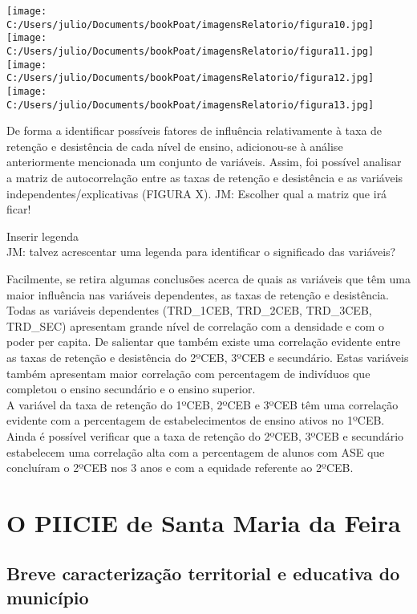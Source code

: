 \documentclass[
]{book}
\begin{document}
\texttt{[image: C:/Users/julio/Documents/bookPoat/imagensRelatorio/figura10.jpg]}\\
\texttt{[image: C:/Users/julio/Documents/bookPoat/imagensRelatorio/figura11.jpg]}\\
\texttt{[image: C:/Users/julio/Documents/bookPoat/imagensRelatorio/figura12.jpg]}\\
\texttt{[image: C:/Users/julio/Documents/bookPoat/imagensRelatorio/figura13.jpg]}

De forma a identificar possíveis fatores de influência relativamente à taxa de retenção e desistência de cada nível de ensino, adicionou-se à análise anteriormente mencionada um conjunto de variáveis. Assim, foi possível analisar a matriz de autocorrelação entre as taxas de retenção e desistência e as variáveis independentes/explicativas (FIGURA X).
JM: Escolher qual a matriz que irá ficar!

Inserir legenda\\
JM: talvez acrescentar uma legenda para identificar o significado das variáveis?

Facilmente, se retira algumas conclusões acerca de quais as variáveis que têm uma maior influência nas variáveis dependentes, as taxas de retenção e desistência. Todas as variáveis dependentes (TRD\_1CEB, TRD\_2CEB, TRD\_3CEB, TRD\_SEC) apresentam grande nível de correlação com a densidade e com o poder per capita. De salientar que também existe uma correlação evidente entre as taxas de retenção e desistência do 2ºCEB, 3ºCEB e secundário. Estas variáveis também apresentam maior correlação com percentagem de indivíduos que completou o ensino secundário e o ensino superior.\\
A variável da taxa de retenção do 1ºCEB, 2ºCEB e 3ºCEB têm uma correlação evidente com a percentagem de estabelecimentos de ensino ativos no 1ºCEB. Ainda é possível verificar que a taxa de retenção do 2ºCEB, 3ºCEB e secundário estabelecem uma correlação alta com a percentagem de alunos com ASE que concluíram o 2ºCEB nos 3 anos e com a equidade referente ao 2ºCEB.

\hypertarget{PIICIE}{%
\chapter{O PIICIE de Santa Maria da Feira}\label{PIICIE}}

\hypertarget{breve-caracterizauxe7uxe3o-territorial-e-educativa-do-municuxedpio}{%
\section{Breve caracterização territorial e educativa do município}\label{breve-caracterizauxe7uxe3o-territorial-e-educativa-do-municuxedpio}}
\end{document}
